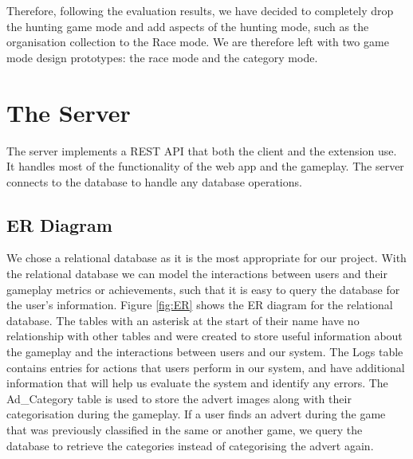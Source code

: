 \documentclass{l4proj}
\begin{document}
Therefore, following the evaluation results, we have decided to completely drop the hunting game mode and add aspects of the hunting mode, such as the organisation collection to the Race mode. We are therefore left with two game mode design prototypes: the race mode and the category mode.

\section{The Server}
The server implements a REST API that both the client and the extension use. It handles most of the functionality of the web app and the gameplay. The server connects to the database to handle any database operations. 

\subsection{ER Diagram}
We chose a relational database as it is the most appropriate for our project. With the relational database we can model the interactions between users and their gameplay metrics or achievements, such that it is easy to query the database for the user's information. Figure \ref{fig:ER} shows the ER diagram for the relational database. The tables with an asterisk at the start of their name have no relationship with other tables and were created to store useful information about the gameplay and the interactions between users and our system. The Logs table contains entries for actions that users perform in our system, and have additional information that will help us evaluate the system and identify any errors. The Ad\_Category table is used to store the advert images along with their categorisation during the gameplay. If a user finds an advert during the game that was previously classified in the same or another game, we query the database to retrieve the categories instead of categorising the advert again.
\end{document}
